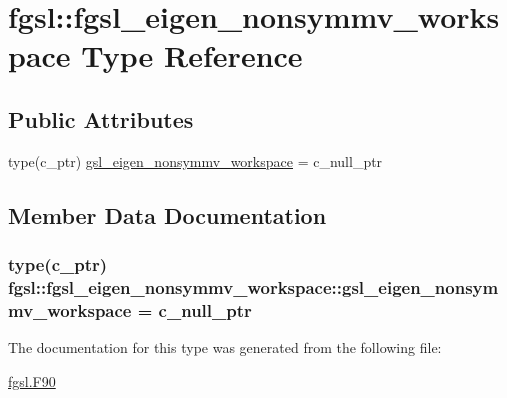 \hypertarget{structfgsl_1_1fgsl__eigen__nonsymmv__workspace}{}\section{fgsl\+:\+:fgsl\+\_\+eigen\+\_\+nonsymmv\+\_\+workspace Type Reference}
\label{structfgsl_1_1fgsl__eigen__nonsymmv__workspace}
\subsection*{Public Attributes}
\begin{DoxyCompactItemize}
\item 
type(c\+\_\+ptr) \hyperlink{structfgsl_1_1fgsl__eigen__nonsymmv__workspace_a3ec6c0a7879746daf301e68adf02a03d}{gsl\+\_\+eigen\+\_\+nonsymmv\+\_\+workspace} = c\+\_\+null\+\_\+ptr
\end{DoxyCompactItemize}


\subsection{Member Data Documentation}
\hypertarget{structfgsl_1_1fgsl__eigen__nonsymmv__workspace_a3ec6c0a7879746daf301e68adf02a03d}{}
\subsubsection[{gsl\+\_\+eigen\+\_\+nonsymmv\+\_\+workspace}]{\setlength{\rightskip}{0pt plus 5cm}type(c\+\_\+ptr) fgsl\+::fgsl\+\_\+eigen\+\_\+nonsymmv\+\_\+workspace\+::gsl\+\_\+eigen\+\_\+nonsymmv\+\_\+workspace = c\+\_\+null\+\_\+ptr}\label{structfgsl_1_1fgsl__eigen__nonsymmv__workspace_a3ec6c0a7879746daf301e68adf02a03d}


The documentation for this type was generated from the following file\+:\begin{DoxyCompactItemize}
\item 
\hyperlink{fgsl_8F90}{fgsl.\+F90}\end{DoxyCompactItemize}
